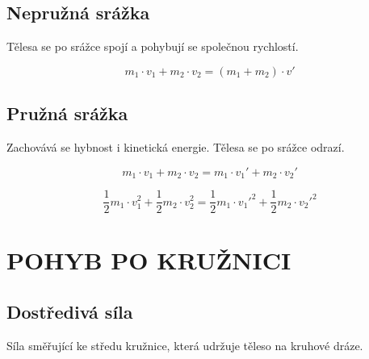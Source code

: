 \documentclass[a4paper,11pt]{article}
\begin{document}
\subsection{Nepružná srážka}

\begin{definitionbox}
Tělesa se po srážce spojí a pohybují se společnou rychlostí.
\end{definitionbox}

\begin{equationbox}
\begin{equation*}
    m_1 \cdot v_1 + m_2 \cdot v_2 = (m_1 + m_2) \cdot v'
\end{equation*}
\end{equationbox}

\subsection{Pružná srážka}

\begin{definitionbox}
Zachovává se hybnost i kinetická energie. Tělesa se po srážce odrazí.
\end{definitionbox}

\begin{equationbox}
\begin{equation*}
    m_1 \cdot v_1 + m_2 \cdot v_2 = m_1 \cdot v_1' + m_2 \cdot v_2'
\end{equation*}
\end{equationbox}

\begin{equationbox}
\begin{equation*}
    \frac{1}{2}m_1 \cdot v_1^2 + \frac{1}{2}m_2 \cdot v_2^2 = \frac{1}{2}m_1 \cdot v_1'^2 + \frac{1}{2}m_2 \cdot v_2'^2
\end{equation*}
\end{equationbox}

\section{POHYB PO KRUŽNICI}

\subsection{Dostředivá síla}

\begin{definitionbox}
Síla směřující ke středu kružnice, která udržuje těleso na kruhové dráze.
\end{definitionbox}
\end{document}
